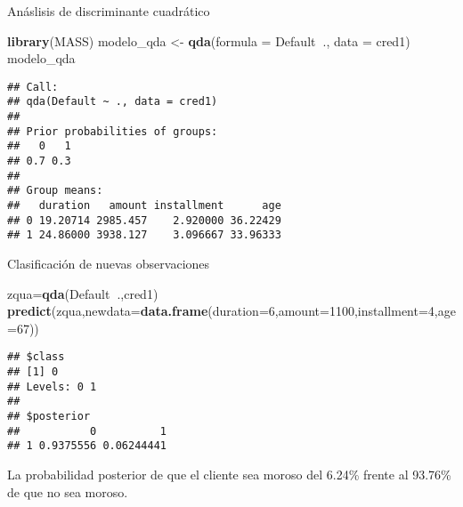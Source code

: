 \documentclass[ignorenonframetext,]{beamer}
\newenvironment{Shaded}{\begin{snugshade}}{\end{snugshade}}
\newcommand{\KeywordTok}[1]{\textcolor[rgb]{0.13,0.29,0.53}{\textbf{#1}}}
\newcommand{\DataTypeTok}[1]{\textcolor[rgb]{0.13,0.29,0.53}{#1}}
\newcommand{\DecValTok}[1]{\textcolor[rgb]{0.00,0.00,0.81}{#1}}
\newcommand{\StringTok}[1]{\textcolor[rgb]{0.31,0.60,0.02}{#1}}
\newcommand{\OperatorTok}[1]{\textcolor[rgb]{0.81,0.36,0.00}{\textbf{#1}}}
\newcommand{\NormalTok}[1]{#1}
\begin{document}
\begin{frame}[fragile]{Anáslisis de discriminante cuadrático}

\hypertarget{left}{}
\begin{Shaded}
\begin{Highlighting}[]
\KeywordTok{library}\NormalTok{(MASS)}
\NormalTok{modelo_qda <-}\StringTok{ }\KeywordTok{qda}\NormalTok{(}\DataTypeTok{formula =}\NormalTok{ Default}\OperatorTok{~}\NormalTok{., }\DataTypeTok{data =}\NormalTok{ cred1)}
\NormalTok{modelo_qda}
\end{Highlighting}
\end{Shaded}

\hypertarget{right}{}
\begin{verbatim}
## Call:
## qda(Default ~ ., data = cred1)
## 
## Prior probabilities of groups:
##   0   1 
## 0.7 0.3 
## 
## Group means:
##   duration   amount installment      age
## 0 19.20714 2985.457    2.920000 36.22429
## 1 24.86000 3938.127    3.096667 33.96333
\end{verbatim}

\end{frame}

\begin{frame}[fragile]{Clasificación de nuevas observaciones}

\begin{Shaded}
\begin{Highlighting}[]
\NormalTok{zqua=}\KeywordTok{qda}\NormalTok{(Default}\OperatorTok{~}\NormalTok{.,cred1)}
\KeywordTok{predict}\NormalTok{(zqua,}\DataTypeTok{newdata=}\KeywordTok{data.frame}\NormalTok{(}\DataTypeTok{duration=}\DecValTok{6}\NormalTok{,}\DataTypeTok{amount=}\DecValTok{1100}\NormalTok{,}\DataTypeTok{installment=}\DecValTok{4}\NormalTok{,}\DataTypeTok{age=}\DecValTok{67}\NormalTok{))}
\end{Highlighting}
\end{Shaded}

\begin{verbatim}
## $class
## [1] 0
## Levels: 0 1
## 
## $posterior
##           0          1
## 1 0.9375556 0.06244441
\end{verbatim}

La probabilidad posterior de que el cliente sea moroso del 6.24\% frente
al 93.76\% de que no sea moroso.

\end{frame}
\end{document}

